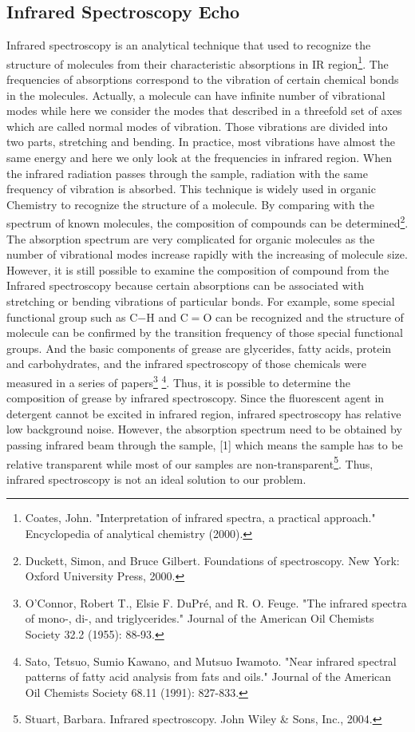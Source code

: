 \documentclass[a4paper ,12pt]{article}
\begin{document}
\subsection{Infrared Spectroscopy Echo}
Infrared spectroscopy is an analytical technique that used to recognize the structure of molecules from their characteristic absorptions in IR region\footnote{Coates, John. "Interpretation of infrared spectra, a practical approach." Encyclopedia of analytical chemistry (2000).}. The frequencies of absorptions correspond to the vibration of certain chemical bonds in the molecules. Actually, a molecule can have infinite number of vibrational modes while here we consider the modes that described in a threefold set of axes which are called normal modes of vibration. Those vibrations are divided into two parts, stretching and bending. In practice, most vibrations have almost the same energy and here we only look at the frequencies in infrared region. When the infrared radiation passes through the sample, radiation with the same frequency of vibration is absorbed. This technique is widely used in organic Chemistry to recognize the structure of a molecule. By comparing with the spectrum of known molecules, the composition of compounds can be determined\footnote{Duckett, Simon, and Bruce Gilbert. Foundations of spectroscopy. New York: Oxford University Press, 2000.}. 
The absorption spectrum are very complicated for organic molecules as the number of vibrational modes increase rapidly with the increasing of molecule size. However, it is still possible to examine the composition of compound from the Infrared spectroscopy because certain absorptions can be associated with stretching or bending vibrations of particular bonds. For example, some special functional group such as C$-$H and C$=$O can be recognized and the structure of molecule can be confirmed by the transition frequency of those special functional groups. And the basic components of grease are glycerides, fatty acids, protein and carbohydrates, and the infrared spectroscopy of those chemicals were measured in a series of papers\footnote{O'Connor, Robert T., Elsie F. DuPr\'{e}, and R. O. Feuge. "The infrared spectra of mono-, di-, and triglycerides." Journal of the American Oil Chemists Society 32.2 (1955): 88-93.} \footnote{Sato, Tetsuo, Sumio Kawano, and Mutsuo Iwamoto. "Near infrared spectral patterns of fatty acid analysis from fats and oils." Journal of the American Oil Chemists Society 68.11 (1991): 827-833.}. Thus, it is possible to determine the composition of grease by infrared spectroscopy.
Since the fluorescent agent in detergent cannot be excited in infrared region, infrared spectroscopy has relative low background noise. However, the absorption spectrum need to be obtained by passing infrared beam through the sample, [1] which means the sample has to be relative transparent while most of our samples are non-transparent\footnote{Stuart, Barbara. Infrared spectroscopy. John Wiley \& Sons, Inc., 2004.}. Thus, infrared spectroscopy is not an ideal solution to our problem.
\end{document}
